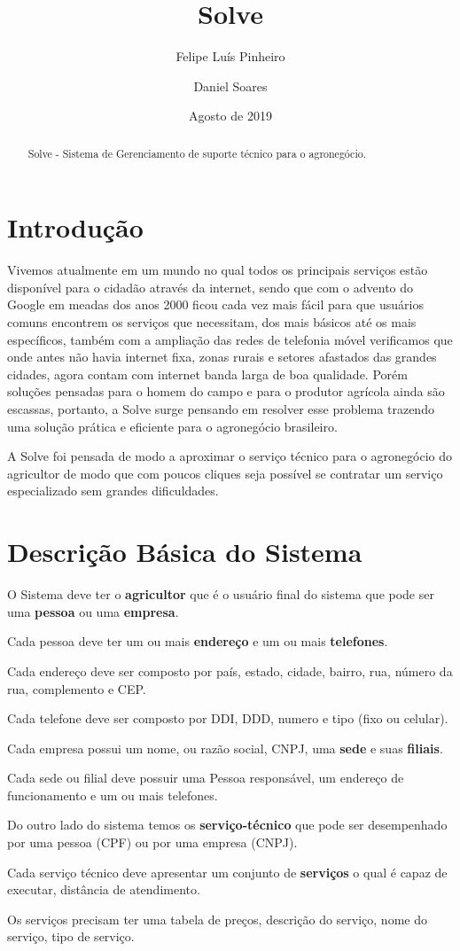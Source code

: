 \documentclass{article}
\title{Solve}
\author{Felipe Luís Pinheiro \and Daniel Soares}
\date{Agosto de 2019}
\begin{document}
\maketitle

\begin{abstract}
    Solve - Sistema de Gerenciamento de suporte técnico para o agronegócio.
\end{abstract}

\section{Introdução}
    Vivemos atualmente em um mundo no qual todos os principais serviços estão disponível para o cidadão através da internet, sendo que com o advento do Google em meadas dos anos 2000 ficou cada vez mais fácil para que usuários comuns encontrem os serviços que necessitam, dos mais básicos até os mais específicos, também com a ampliação das redes de telefonia móvel verificamos que onde antes não havia internet fixa, zonas rurais e setores afastados das grandes cidades, agora contam com internet banda larga de boa qualidade. Porém soluções pensadas para o homem do campo e para o produtor agrícola ainda são escassas, portanto, a Solve surge pensando em resolver esse problema trazendo uma solução prática e eficiente para o agronegócio brasileiro.
    
    A Solve foi pensada de modo a aproximar o serviço técnico para o agronegócio do agricultor de modo que com poucos cliques seja possível se contratar um serviço especializado sem grandes dificuldades. 
    
\section{Descrição Básica do Sistema}

    O Sistema deve ter o \textbf{agricultor} que é o usuário final do sistema que pode ser uma \textbf{pessoa} ou uma \textbf{empresa}.
    
    Cada pessoa deve ter um ou mais \textbf{endereço} e um ou mais \textbf{telefones}.
    
    Cada endereço deve ser composto por país, estado, cidade, bairro, rua, número da rua, complemento e CEP.
    
    Cada telefone deve ser composto por DDI, DDD, numero e tipo (fixo ou celular).
    
    Cada empresa possui um nome, ou razão social, CNPJ, uma \textbf{sede} e suas \textbf{filiais}.
    
    Cada sede ou filial deve possuir uma Pessoa responsável, um endereço de funcionamento e um ou mais telefones.
    
    Do outro lado do sistema temos os \textbf{serviço-técnico} que pode ser desempenhado por uma pessoa (CPF) ou por uma empresa (CNPJ).
    
    Cada serviço técnico deve apresentar um conjunto de \textbf{serviços} o qual é capaz de executar, distância de atendimento.
    
    Os serviços precisam ter uma tabela de preços, descrição do serviço, nome do serviço, tipo de serviço.
    


\end{document}
